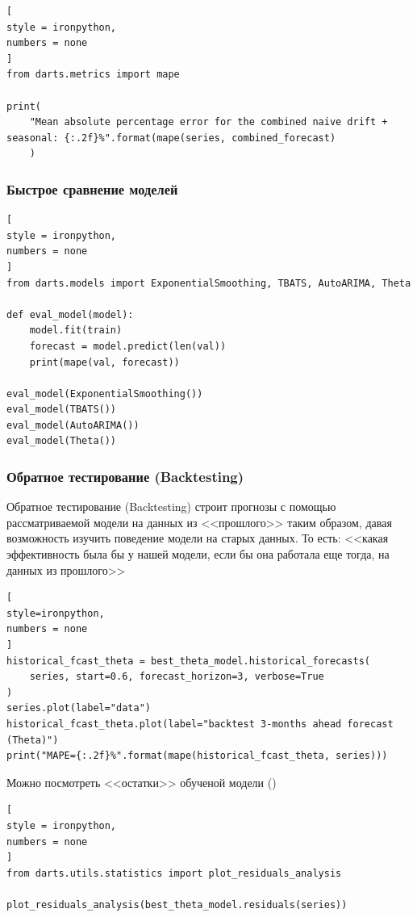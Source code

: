 \documentclass[%
	11pt,
	a4paper,
	utf8,
		]{article}
\begin{document}
\begin{lstlisting}[
style = ironpython,
numbers = none
]
from darts.metrics import mape

print(
    "Mean absolute percentage error for the combined naive drift + seasonal: {:.2f}%".format(mape(series, combined_forecast)
    )
\end{lstlisting}

\subsubsection{Быстрое сравнение моделей}

\begin{lstlisting}[
style = ironpython,
numbers = none
]
from darts.models import ExponentialSmoothing, TBATS, AutoARIMA, Theta

def eval_model(model):
    model.fit(train)
    forecast = model.predict(len(val))
    print(mape(val, forecast))
    
eval_model(ExponentialSmoothing())
eval_model(TBATS())
eval_model(AutoARIMA())
eval_model(Theta())
\end{lstlisting}

\subsubsection{Обратное тестирование (Backtesting)}

Обратное тестирование (Backtesting) строит прогнозы с помощью рассматриваемой модели на данных из <<прошлого>> таким образом, давая возможность изучить поведение модели на старых данных. То есть: <<какая эффективность была бы у нашей модели, если бы она работала еще тогда, на данных из прошлого>>
\begin{lstlisting}[
style=ironpython,
numbers = none
]
historical_fcast_theta = best_theta_model.historical_forecasts(
    series, start=0.6, forecast_horizon=3, verbose=True
)
series.plot(label="data")
historical_fcast_theta.plot(label="backtest 3-months ahead forecast (Theta)")
print("MAPE={:.2f}%".format(mape(historical_fcast_theta, series)))
\end{lstlisting}

Можно посмотреть <<остатки>> обученой модели ()
\begin{lstlisting}[
style = ironpython,
numbers = none
]
from darts.utils.statistics import plot_residuals_analysis

plot_residuals_analysis(best_theta_model.residuals(series))
\end{lstlisting}
\end{document}
